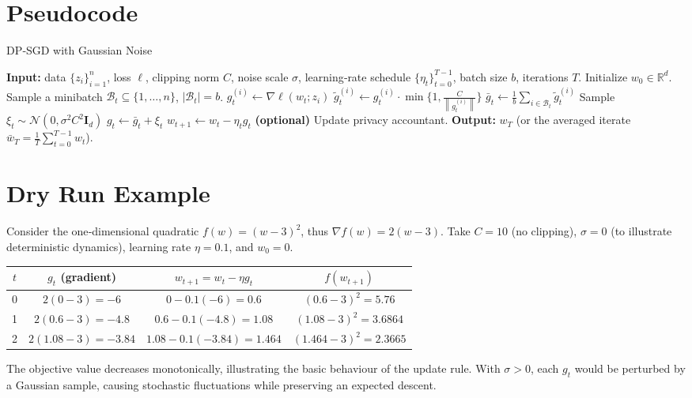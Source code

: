 \documentclass[11pt]{article}
\newcommand{\R}{\mathbb{R}}
\newcommand{\norm}[1]{\left\lVert#1\right\rVert}
\newcommand{\grad}{\nabla}
\begin{document}
\section*{Pseudocode}
\begin{algorithm}[H]
\caption{DP‑SGD with Gaussian Noise}
\begin{algorithmic}[1]
\State \textbf{Input:} data $\{z_i\}_{i=1}^n$, loss $\ell$, clipping norm $C$, noise scale $\sigma$, learning‑rate schedule $\{\eta_t\}_{t=0}^{T-1}$, batch size $b$, iterations $T$.
\State Initialize $w_0\in\R^{d}$.
    \State Sample a minibatch $\mathcal B_t\subseteq\{1,\dots,n\}$, $|\mathcal B_t|=b$.
        \State $g_t^{(i)}\gets\grad\ell(w_t;z_i)$
        \State $\tilde g_t^{(i)}\gets g_t^{(i)}\cdot\min\{1,\frac{C}{\norm{g_t^{(i)}}}\}$
    \EndFor
    \State $\bar g_t \gets \frac{1}{b}\sum_{i\in\mathcal B_t}\tilde g_t^{(i)}$
    \State Sample $\xi_t\sim\mathcal N(0,\sigma^{2}C^{2}\mathbf I_d)$
    \State $g_t\gets \bar g_t+\xi_t$
    \State $w_{t+1}\gets w_t-\eta_t g_t$
    \State \textbf{(optional)} Update privacy accountant.
\EndFor
\State \textbf{Output:} $w_T$ (or the averaged iterate $\bar w_T=\frac1T\sum_{t=0}^{T-1}w_t$).
\end{algorithmic}
\end{algorithm}

\section*{Dry Run Example}
Consider the one‑dimensional quadratic $f(w)=(w-3)^2$, thus $\grad f(w)=2(w-3)$.  
Take $C=10$ (no clipping), $\sigma=0$ (to illustrate deterministic dynamics), learning rate $\eta=0.1$, and $w_0=0$.  

\begin{center}
\begin{tabular}{c|c|c|c}
$t$ & $g_t$ (gradient) & $w_{t+1}=w_t-\eta g_t$ & $f(w_{t+1})$\\\hline
0 & $2(0-3)=-6$ & $0-0.1(-6)=0.6$ & $(0.6-3)^2=5.76$\\
1 & $2(0.6-3)=-4.8$ & $0.6-0.1(-4.8)=1.08$ & $(1.08-3)^2=3.6864$\\
2 & $2(1.08-3)=-3.84$ & $1.08-0.1(-3.84)=1.464$ & $(1.464-3)^2=2.3665$\\
\end{tabular}
\end{center}
The objective value decreases monotonically, illustrating the basic behaviour of the update rule. With $\sigma>0$, each $g_t$ would be perturbed by a Gaussian sample, causing stochastic fluctuations while preserving an expected descent.
\end{document}
